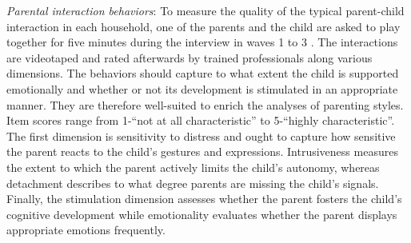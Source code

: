 \textit{Parental interaction behaviors}: To measure the quality of the typical parent-child interaction in each household, one of the parents and the child are asked to play together for five minutes during the interview in waves 1 to 3 \parencite[for a more detailed description, see]{linbergQualityParentChildInteractions2019}. The interactions are videotaped and rated afterwards by trained professionals along various dimensions. The behaviors should capture to what extent the child is supported emotionally and whether or not its development is stimulated in an appropriate manner. They are therefore well-suited to enrich the analyses of parenting styles. Item scores range from 1-``not at all characteristic'' to 5-``highly characteristic''. The first dimension is sensitivity to distress and ought to capture how sensitive the parent reacts to the child's gestures and expressions. Intrusiveness measures the extent to which the parent actively limits the child's autonomy, whereas detachment describes to what degree parents are missing the child's signals. Finally, the stimulation dimension assesses whether the parent fosters the child's cognitive development while emotionality evaluates whether the parent displays appropriate emotions frequently.


